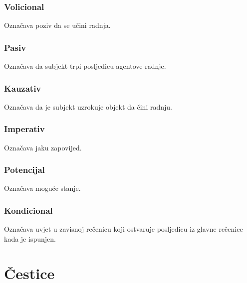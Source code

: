 \documentclass[a4paper, 12pt]{amsart}
\begin{document}
  \subsubsection{Volicional}
  Označava poziv da se učini radnja.

  \subsubsection{Pasiv}
  Označava da subjekt trpi posljedicu agentove radnje.

  \subsubsection{Kauzativ}
  Označava da je subjekt uzrokuje objekt da čini radnju.

  \subsubsection{Imperativ}
  Označava jaku zapovijed.

  \subsubsection{Potencijal}
  Označava moguće stanje.

  \subsubsection{Kondicional}
  Označava uvjet u zavisnoj rečenicu koji ostvaruje posljedicu iz glavne rečenice kada je ispunjen.

  \section{Čestice}
\end{document}

